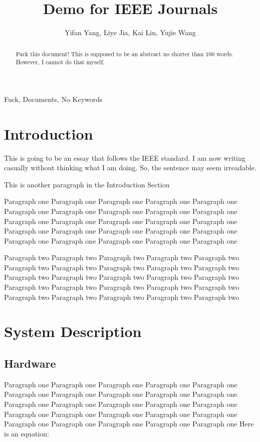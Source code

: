 \documentclass[10pt,journal,final,a4paper,nofonttune]{IEEEtran}
\title{Demo for IEEE Journals}
\author{Yifan Yang, Liye Jia, Kai Lin, Yujie Wang}
\begin{document}
\maketitle

\begin{abstract}
    Fuck this document! This is supposed to be an abstract no shorter 
    than 100 words. However, I cannot do that myself.
\end{abstract}

\begin{IEEEkeywords}
    Fuck, Documents, No Keywords
\end{IEEEkeywords}


\section{Introduction}
This is going to be an essay that follows the IEEE standard.
I am now writing casually without thinking what I am doing. So, the 
sentence may seem irreadable.
\cite{gomez2012overview}

This is another paragraph in the Introduction Section

Paragraph one Paragraph one Paragraph one Paragraph one Paragraph one 
Paragraph one Paragraph one Paragraph one Paragraph one Paragraph one 
Paragraph one Paragraph one Paragraph one Paragraph one Paragraph one 
Paragraph one Paragraph one Paragraph one Paragraph one Paragraph one 
Paragraph one Paragraph one Paragraph one Paragraph one Paragraph one 

Paragraph two Paragraph two Paragraph two Paragraph two Paragraph two 
Paragraph two Paragraph two Paragraph two Paragraph two Paragraph two 
Paragraph two Paragraph two Paragraph two Paragraph two Paragraph two 
Paragraph two Paragraph two Paragraph two Paragraph two Paragraph two 
Paragraph two Paragraph two Paragraph two Paragraph two Paragraph two 


\section{System Description}

\subsection{Hardware}

Paragraph one Paragraph one Paragraph one Paragraph one Paragraph one 
Paragraph one Paragraph one Paragraph one Paragraph one Paragraph one 
Paragraph one Paragraph one Paragraph one Paragraph one Paragraph one 
Paragraph one Paragraph one Paragraph one Paragraph one Paragraph one 
Paragraph one Paragraph one Paragraph one Paragraph one Paragraph one 
Here is an equation: 
\end{document}
